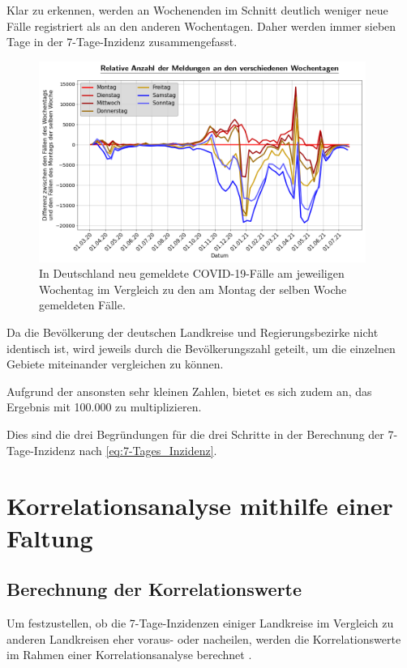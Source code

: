 Klar zu erkennen, werden an Wochenenden im Schnitt deutlich weniger neue Fälle registriert als an den anderen Wochentagen.
Daher werden immer sieben Tage in der 7-Tage-Inzidenz zusammengefasst.
\begin{figure}[H]
    \centering
    \includegraphics[width=0.95\textwidth]{figures/Grundlagen/neue_Fälle_pro_Wochentag_Deutschland.png}
    \caption{In Deutschland neu gemeldete COVID-19-Fälle am jeweiligen Wochentag im Vergleich zu den am Montag der selben Woche gemeldeten Fälle.}
    \label{fig:neue_Fälle_pro_Wochentag_Deutschland}
\end{figure}
Da die Bevölkerung der deutschen Landkreise und Regierungsbezirke nicht identisch ist, wird jeweils durch die Bevölkerungszahl geteilt, um die einzelnen Gebiete miteinander vergleichen zu können.

Aufgrund der ansonsten sehr kleinen Zahlen, bietet es sich zudem an, das Ergebnis mit 100.000 zu multiplizieren.

Dies sind die drei Begründungen für die drei Schritte in der Berechnung der 7-Tage-Inzidenz nach \autoref{eq:7-Tages_Inzidenz}.


\section{Korrelationsanalyse mithilfe einer Faltung}\label{sec:BeschreibungKorrelationsanalyse}
\subsection{Berechnung der Korrelationswerte}\label{sec:Grundlagen:BerechnungderKorrelationwertes}
Um festzustellen, ob die 7-Tage-Inzidenzen einiger Landkreise im Vergleich zu anderen Landkreisen eher voraus- oder nacheilen, werden die Korrelationswerte im Rahmen einer Korrelationsanalyse berechnet \autocite{Korrelation}.

